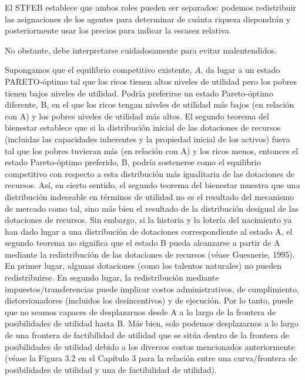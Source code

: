 \documentclass[10pt,a4paper]{article}
\begin{document}
El STFEB establece que ambos roles pueden ser separados: podemos redistribuir las asignaciones de los agentes para determinar de cuánta riqueza dispondrán y posteriormente usar los precios para indicar la escasez relativa.

No obstante, debe interpretarse cuidadosamente para evitar malentendidos. 

Supongamos que el equilibrio competitivo existente, $A$, da lugar a un estado PARETO-óptimo tal que los ricos tienen altos niveles de utilidad pero los pobres tienen bajos niveles de utilidad. Podría preferirse un estado Pareto-óptimo diferente, B, en el que los ricos tengan niveles de utilidad más bajos (en relación con A) y los pobres niveles de utilidad más altos. El segundo teorema del bienestar establece que si la distribución inicial de las dotaciones de recursos (incluidas las capacidades inherentes y la propiedad inicial de los activos) fuera tal que los pobres tuvieran más (en relación con A) y los ricos menos, entonces el estado Pareto-óptimo preferido, B, podría sostenerse como el equilibrio competitivo con respecto a esta distribución más igualitaria de las dotaciones de recursos. Así, en cierto sentido, el segundo teorema del bienestar muestra que una distribución indeseable en términos de utilidad no es el resultado del mecanismo de mercado como tal, sino más bien el resultado de la distribución desigual de las dotaciones de recursos. Sin embargo, si la historia y la lotería del nacimiento ya han dado lugar a una distribución de dotaciones correspondiente al estado A, el segundo teorema no significa que el estado B pueda alcanzarse a partir de A mediante la redistribución de las dotaciones de recursos (véase Guesnerie, 1995). En primer lugar, algunas dotaciones (como los talentos naturales) no pueden redistribuirse. En segundo lugar, la redistribución mediante impuestos/transferencias puede implicar costos administrativos, de cumplimiento, distorsionadores (incluidos los desincentivos) y de ejecución. Por lo tanto, puede que no seamos capaces de desplazarnos desde A a lo largo de la frontera de posibilidades de utilidad hasta B. Más bien, solo podemos desplazarnos a lo largo de una frontera de factibilidad de utilidad que se sitúa dentro de la frontera de posibilidades de utilidad debido a los diversos costos mencionados anteriormente (véase la Figura 3.2 en el Capítulo 3 para la relación entre una curva/frontera de posibilidades de utilidad y una de factibilidad de utilidad).
\end{document}
